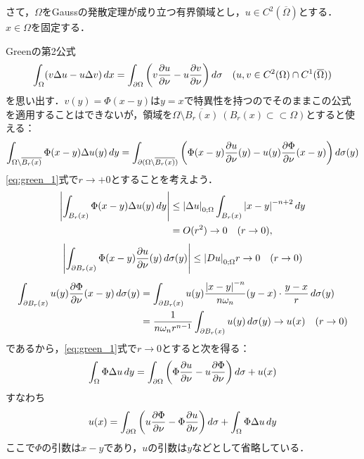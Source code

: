 \documentclass[a4paper]{ltjsarticle}
\newcommand{\Om}{\Omega}
\newcommand{\pOm}{\partial\Omega}
\newcommand{\Ombar}{\overline{\Omega}}
\newcommand{\ssubset}{\subset\subset}
\newcommand{\pvert}[1]{\frac{\partial #1}{\partial \nu}}
\newcommand{\1}{\mathbbm{1}}
\numberwithin{equation}{section}
\theoremstyle{definition}
\begin{document}
さて，$\Om$をGaussの発散定理が成り立つ有界領域とし，$u\in C^2(\Ombar)$とする．$x\in\Omega$を固定する．

Greenの第2公式
\begin{equation}
    \int_{\Om}(v\Delta u-u\Delta v)\,dx=\int_{\pOm}\qty(v\frac{\partial u}{\partial \nu}-u\frac{\partial v}{\partial \nu})\,d\sigma\quad (u,v\in C^2(\Om)\cap C^1(\Ombar))
\end{equation}
を思い出す．$v(y)=\Phi(x-y)$は$y=x$で特異性を持つのでそのままこの公式を適用することはできないが，領域を$\Omega\setminus \overline{B_r(x)}\ (B_r(x)\ssubset \Om)$とすると使える：
\begin{equation}
    \int_{\Omega\setminus \overline{B_r(x)}}\Phi(x-y)\Delta u(y)\,dy=\int_{\partial(\Omega\setminus \overline{B_r(x)})}\qty(\Phi(x-y)\pvert{u}(y)-u(y)\pvert{\Phi}(x-y))\,d\sigma(y)\label{eq:green_1}
\end{equation}
\eqref{eq:green_1}式で$r\to+0$とすることを考えよう．
\begin{align}
    \abs{\int_{B_r(x)}\Phi(x-y)\Delta u(y)\,dy}&\leq \abs{\Delta u}_{0;\Om}\int_{B_r(x)}\abs{x-y}^{-n+2}\,dy\\
    &=O(r^2)\to0\quad (r\to0),
\end{align}
\begin{align}
    \abs{\int_{\partial B_r(x)}\Phi(x-y)\pvert{u}(y)\,d\sigma(y)}\leq \abs{Du}_{0;\Omega}r\to 0\quad (r\to0)
\end{align}
\begin{align}
    \int_{\partial B_r(x)}u(y)\pvert{\Phi}(x-y)\,d\sigma(y)&=\int_{\partial B_r(x)}u(y)\frac{\abs{x-y}^{-n}}{n\omega_n}(y-x)\cdot\frac{y-x}{r}\,d\sigma(y)\\
    &=\frac{1}{n\omega_nr^{n-1}}\int_{\partial B_r(x)}u(y)\,d\sigma(y)\to u(x)\quad (r\to0)
\end{align}
であるから，\eqref{eq:green_1}式で$r\to0$とすると次を得る：
\begin{equation}
    \int_{\Om}\Phi\Delta u\,dy=\int_{\pOm}\qty(\Phi\pvert{u}-u\pvert{\Phi})\,d\sigma+u(x)
\end{equation}
すなわち
\begin{equation}
    u(x)=\int_{\pOm}\qty(u\pvert{\Phi}-\Phi\pvert{u})\,d\sigma+\int_{\Om}\Phi\Delta u\,dy\label{eq:green_2}
\end{equation}
ここで$\Phi$の引数は$x-y$であり，$u$の引数は$y$などとして省略している．
\end{document}
